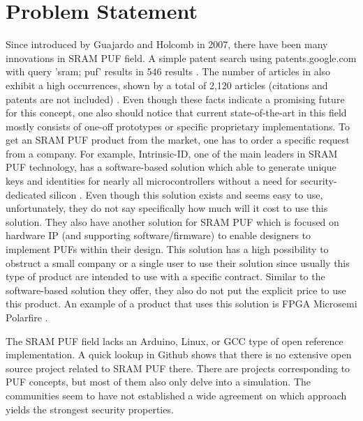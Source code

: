 \section{Problem Statement}\label{ch:problem}


Since introduced by Guajardo and Holcomb in 2007, there have been many innovations in SRAM PUF field. A simple patent search using patents.google.com with query 'sram; puf' results in 546 results \cite{google_patents}. The number of articles in  also exhibit a high occurrences, shown by a total of 2,120 articles (citations and patents are not included) \cite{google_scholar}.
Even though these facts indicate a promising future for this concept, one also should notice that current state-of-the-art in this field mostly consists of one-off prototypes or specific proprietary implementations.
To get an SRAM PUF product from the market, one has to order a specific request from a company. For example, Intrinsic-ID, one of the main leaders in SRAM PUF technology, has a software-based solution which able to generate unique keys and identities for nearly all microcontrollers without a need for security-dedicated silicon \cite{broadkey}. Even though this solution exists and seems easy to use, unfortunately, they do not say specifically how much will it cost to use this solution.
They also have another solution for SRAM PUF which is focused on hardware IP (and supporting software/firmware) to enable designers to implement PUFs within their design.
This solution has a high possibility to obstruct a small company or a single user to use their solution since usually this type of product are intended to use with a specific contract.
Similar to the software-based solution they offer, they also do not put the explicit price to use this product. An example of a product that uses this solution is FPGA Microsemi Polarfire \cite{polarfire}.

The SRAM PUF field lacks an Arduino, Linux, or GCC type of open reference implementation. A quick lookup in Github shows that there is no extensive open source project related to SRAM PUF there. There are projects corresponding to PUF concepts, but most of them also only delve into a simulation.
The communities seem to have not established a wide agreement on which approach yields the strongest security properties.

